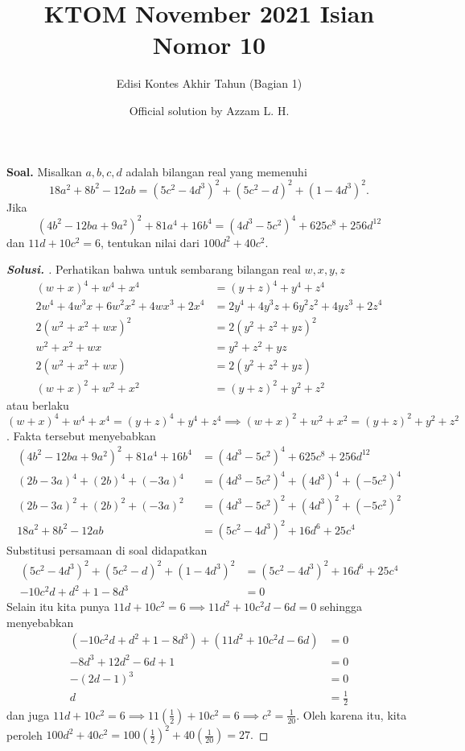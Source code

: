 \documentclass[12pt]{scrartcl}
\title{KTOM November 2021 Isian Nomor 10}
\author{Edisi Kontes Akhir Tahun (Bagian 1)}
\date{Official solution by Azzam L. H.}
\begin{document}
\maketitle
\pagestyle{plain}
	\vspace{-1cm}
  \textbf{Soal.} Misalkan $a,b,c,d$ adalah bilangan real yang memenuhi $$18a^2+8b^2-12ab = (5c^2-4d^3)^2+(5c^2-d)^2+(1-4d^3)^2.$$ Jika $$(4b^2-12ba+9a^2)^2+81a^4+16b^4=(4d^3-5c^2)^4+625c^8+256d^{12}$$ dan $11d+10c^2=6$, tentukan nilai dari $100d^2+40c^2$.
  
  \begin{proof}[\textbf{Solusi. }]
  Perhatikan bahwa untuk sembarang bilangan real $w,x,y,z$
  \begin{align*}
  (w+x)^4+w^4+x^4&=(y+z)^4+y^4+z^4\\
  2w^4+4w^3x+6w^2x^2+4wx^3+2x^4 &= 2y^4+4y^3z+6y^2z^2+4yz^3+2z^4\\
  2(w^2+x^2+wx)^2 &= 2(y^2+z^2+yz)^2\\
  w^2+x^2+wx &= y^2+z^2+yz\\
  2(w^2+x^2+wx) &= 2(y^2+z^2+yz)\\
  (w+x)^2+w^2+x^2 &= (y+z)^2+y^2+z^2
  \end{align*}
  atau berlaku $(w+x)^4+w^4+x^4=(y+z)^4+y^4+z^4 \implies (w+x)^2+w^2+x^2 = (y+z)^2+y^2+z^2$.
  Fakta tersebut menyebabkan
  \begin{align*}
  (4b^2-12ba+9a^2)^2+81a^4+16b^4&=(4d^3-5c^2)^4+625c^8+256d^{12}\\
  (2b-3a)^4+(2b)^4+(-3a)^4&=(4d^3-5c^2)^4+(4d^3)^4+(-5c^2)^4\\
  (2b-3a)^2+(2b)^2+(-3a)^2&=(4d^3-5c^2)^2+(4d^3)^2+(-5c^2)^2\\
  18a^2+8b^2-12ab &= (5c^2-4d^3)^2+16d^6+25c^4
  \end{align*}
  Substitusi persamaan  di soal didapatkan
  \begin{align*}
  (5c^2-4d^3)^2+(5c^2-d)^2+(1-4d^3)^2 &= (5c^2-4d^3)^2+16d^6+25c^4\\
  -10c^2d+d^2+1-8d^3 &= 0
  \end{align*}
  Selain itu kita punya 
  $11d+10c^2=6 \implies 11d^2+10c^2d-6d=0$ sehingga menyebabkan 
  \begin{align*}
  (-10c^2d+d^2+1-8d^3)+(11d^2+10c^2d-6d)&=0\\
  -8d^3+12d^2-6d+1&=0\\
  -(2d-1)^3&=0\\
  d&=\frac{1}{2}
  \end{align*}
  dan juga
  $11d+10c^2=6 \implies 11(\frac{1}{2})+10c^2=6 \implies c^2=\frac{1}{20}.$
  Oleh karena itu, kita peroleh $100d^2+40c^2=100(\frac{1}{2})^2+40(\frac{1}{20})=\boxed{27}.$
  
  \end{proof}
\end{document}
